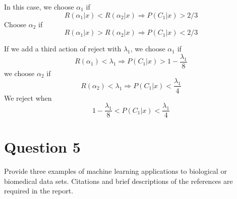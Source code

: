 \documentclass{article}
\begin{document}
\noindent In this case, we choose $\alpha_1$ if $$R(\alpha_1|x) < R(\alpha_2|x) \Rightarrow P(C_1|x)>2/3$$
Choose $\alpha_2$ if $$R(\alpha_1|x) > R(\alpha_2|x) \Rightarrow P(C_1|x)<2/3$$


\noindent If we add a third action of reject with $\lambda_1$, we choose $\alpha_1$ if $$R(\alpha_1) < \lambda_1 \Rightarrow P(C_1|x)>1-\frac{\lambda_1}{8}$$
we choose $\alpha_2$ if $$R(\alpha_2) < \lambda_1 \Rightarrow P(C_1|x)<\frac{\lambda_1}{4}$$
We reject when $$1-\frac{\lambda_1}{8}<P(C_1|x)<\frac{\lambda_1}{4}$$

\section*{Question 5}
Provide three examples of machine learning applications to biological or biomedical data sets. Citations and brief descriptions of the references are required in the report. 
\end{document}
